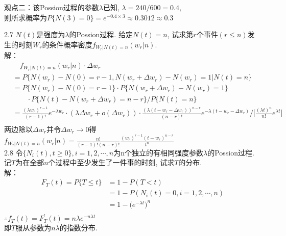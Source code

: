 	观点二：该Possion过程的参数$\lambda$已知, $\lambda = 240/600 = 0.4$, \\
	则所求概率为$P\{N(3) = 0\} = e^{-0.4 \times 3} \approx 0.3012 \approx 0.3$

2.7 $N(t)$是强度为$\lambda$的Possion过程. 给定$N(t) = n$, 试求第$r$个事件$(r \leqslant n)$发生的时刻$W_r$的条件概率密度$f_{W_r|N(t)=n}(w_r|n)$.\\
	解：
	\begin{align*}
	& \quad f_{W_r|N(t)=n}(w_r|n) \cdot \Delta w_r\\
	& = P\{N(w_r) - N(0) = r - 1, N(w_r+\Delta w_r)-N(w_r)=1|N(t) = n\}\\
	& = P\{N(w_r) - N(0) = r - 1\} \cdot P\{N(w_r+\Delta w_r)-N(w_r)=1\}\\
	& \qquad \cdot P\{N(t)-N(w_r+\Delta w_r)=n-r\} / P\{N(t) = n\}\\
	& = \frac{(\lambda w_r)^{r-1}}{(r-1)!}e^{-\lambda w_r} \cdot \left(\lambda \Delta w_r + o(\Delta w_r)\right) \cdot \frac{\left(\lambda (t-w_r-\Delta w_r)\right)^{n-r}}{(n-r)!} e^{-\lambda(t-w_r-\Delta w_r)} \Bigg/ \bigg[\frac{(\lambda t)^n}{n!} e^{\lambda t}\bigg]\\
	\end{align*}
	两边除以$\Delta w_r$并令$\Delta w_r \rightarrow 0$得\\
	$f_{W_r|N(t)=n}(w_r|n) = \frac{n!}{(r-1)!(n-r)!}\frac{(w_r)^{r-1}(t-w_r)^{n-r}}{t^n}$\\


2.8 令$\{N_i(t), t\geqslant 0\}, i = 1,2,\cdots, n$为n个独立的有相同强度参数$\lambda$的Possion过程. 记$T$为在全部$n$个过程中至少发生了一件事的时刻, 试求$T$的分布. \\
	解：
	\begin{align*}
	F_T(t) = P\{T \leqslant t\} & = 1 - P(T<t)\\
							& = 1 - P(N_i(t) = 0, i= 1, 2, \cdots, n)\\
							& = 1 - \big(e^{-\lambda t}\big)^n\\
	\end{align*}
	$\therefore f_T(t) = F^{\prime}_T(t) = n\lambda e^{-n\lambda t}$\\
	即$T$服从参数为$n\lambda$的指数分布.





